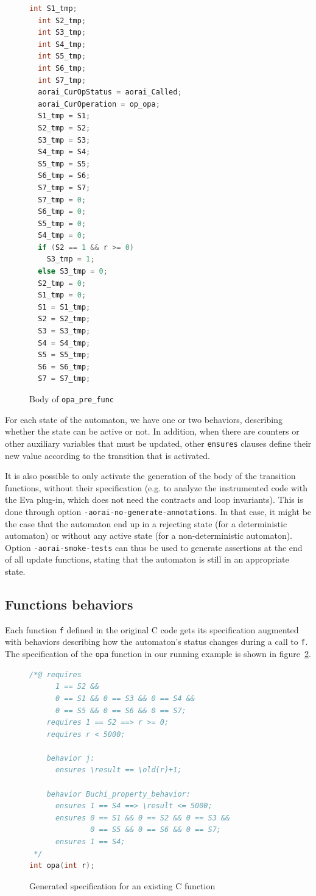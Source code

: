 \documentclass{report}
\begin{document}
\begin{figure}[htbp]
\begin{lstlisting}[language=C,alsolanguage=ACSL]
  int S1_tmp;
  int S2_tmp;
  int S3_tmp;
  int S4_tmp;
  int S5_tmp;
  int S6_tmp;
  int S7_tmp;
  aorai_CurOpStatus = aorai_Called;
  aorai_CurOperation = op_opa;
  S1_tmp = S1;
  S2_tmp = S2;
  S3_tmp = S3;
  S4_tmp = S4;
  S5_tmp = S5;
  S6_tmp = S6;
  S7_tmp = S7;
  S7_tmp = 0;
  S6_tmp = 0;
  S5_tmp = 0;
  S4_tmp = 0;
  if (S2 == 1 && r >= 0)
    S3_tmp = 1;
  else S3_tmp = 0;
  S2_tmp = 0;
  S1_tmp = 0;
  S1 = S1_tmp;
  S2 = S2_tmp;
  S3 = S3_tmp;
  S4 = S4_tmp;
  S5 = S5_tmp;
  S6 = S6_tmp;
  S7 = S7_tmp;
\end{lstlisting}
  \caption{Body of \texttt{opa\_pre\_func}}
  \label{fig:pre-func-body}
\end{figure}
For each state of the automaton, we have one or two behaviors, describing
whether the state can be active or not. In addition, when there are counters
or other auxiliary variables that must be updated, other
\lstinline|ensures| clauses define their new value according to the transition
that is activated.

It is also possible to only activate the generation of the body of the
transition functions, without their specification (e.g. to analyze the
instrumented code with the Eva plug-in, which does not need the contracts and
loop invariants). This is done through option
\lstinline|-aorai-no-generate-annotations|. In that case, it might be the case
that the automaton end up in a rejecting state (for a deterministic automaton)
or without any active state (for a non-deterministic automaton). Option
\lstinline|-aorai-smoke-tests| can thus be used to generate assertions at
the end of all update functions, stating that the automaton is still in an
appropriate state.

\subsection{Functions behaviors}

Each function \texttt{f} defined in the original C code gets its specification
augmented with behaviors describing how the automaton's status changes during
a call to \texttt{f}. The specification of the \texttt{opa} function in our
running example is shown in figure~\ref{fig:generated-spec}.
\begin{figure}[ht]
\begin{lstlisting}[language=C,alsolanguage=ACSL]
/*@ requires
      1 == S2 &&
      0 == S1 && 0 == S3 && 0 == S4 &&
      0 == S5 && 0 == S6 && 0 == S7;
    requires 1 == S2 ==> r >= 0;
    requires r < 5000;
    
    behavior j:
      ensures \result == \old(r)+1;
    
    behavior Buchi_property_behavior:
      ensures 1 == S4 ==> \result <= 5000;
      ensures 0 == S1 && 0 == S2 && 0 == S3 &&
              0 == S5 && 0 == S6 && 0 == S7;
      ensures 1 == S4;
 */
int opa(int r);
\end{lstlisting}
\caption{Generated specification for an existing C function}
\label{fig:generated-spec}
\end{figure}
\end{document}
